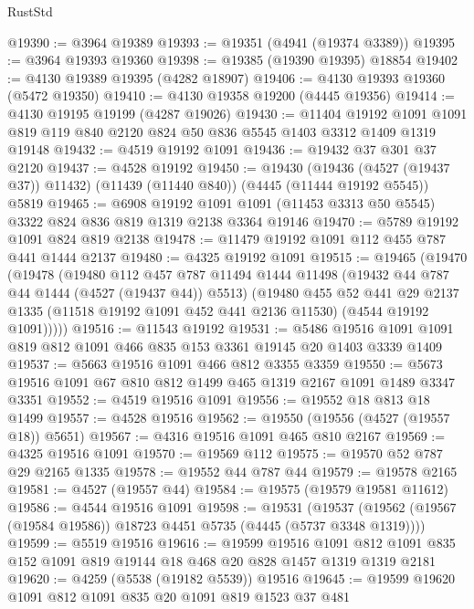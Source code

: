 \begin{lexlean}{RustStd}
\begin{coremodule}
@19390 := @3964 @19389
@19393 := @19351 (@4941 (@19374 @3389))
@19395 := @3964 @19393 @19360
@19398 := @19385 (@19390 @19395) @18854
@19402 := @4130 @19389 @19395 (@4282 @18907)
@19406 := @4130 @19393 @19360 (@5472 @19350)
@19410 := @4130 @19358 @19200 (@4445 @19356)
@19414 := @4130 @19195 @19199 (@4287 @19026)
@19430 := @11404
    @19192
    @1091
    @1091
    @819
    @119
    @840
    @2120
    @824
    @50
    @836
    @5545
    @1403
    @3312
    @1409
    @1319
    @19148
@19432 := @4519 @19192 @1091
@19436 := @19432 @37 @301 @37 @2120
@19437 := @4528 @19192
@19450 := @19430
    (@19436 (@4527 (@19437 @37)) @11432)
    (@11439 (@11440 @840))
    (@4445 (@11444 @19192 @5545))
    @5819
@19465 := @6908
    @19192
    @1091
    @1091
    (@11453 @3313 @50 @5545)
    @3322
    @824
    @836
    @819
    @1319
    @2138
    @3364
    @19146
@19470 := @5789 @19192 @1091 @824 @819 @2138
@19478 := @11479 @19192 @1091 @112 @455 @787 @441 @1444 @2137
@19480 := @4325 @19192 @1091
@19515 := @19465
    (@19470
      (@19478
        (@19480
          @112
          @457
          @787
          @11494
          @1444
          @11498
          (@19432 @44 @787 @44 @1444 (@4527 (@19437 @44)) @5513)
          (@19480
            @455
            @52
            @441
            @29
            @2137
            @1335
            (@11518 @19192 @1091 @452 @441 @2136 @11530)
            (@4544 @19192 @1091)))))
@19516 := @11543 @19192
@19531 := @5486 @19516 @1091 @1091 @819 @812 @1091 @466 @835 @153 @3361 @19145 @20 @1403 @3339 @1409
@19537 := @5663 @19516 @1091 @466 @812 @3355 @3359
@19550 := @5673 @19516 @1091 @67 @810 @812 @1499 @465 @1319 @2167 @1091 @1489 @3347 @3351
@19552 := @4519 @19516 @1091
@19556 := @19552 @18 @813 @18 @1499
@19557 := @4528 @19516
@19562 := @19550 (@19556 (@4527 (@19557 @18)) @5651)
@19567 := @4316 @19516 @1091 @465 @810 @2167
@19569 := @4325 @19516 @1091
@19570 := @19569 @112
@19575 := @19570 @52 @787 @29 @2165 @1335
@19578 := @19552 @44 @787 @44
@19579 := @19578 @2165
@19581 := @4527 (@19557 @44)
@19584 := @19575 (@19579 @19581 @11612)
@19586 := @4544 @19516 @1091
@19598 := @19531
    (@19537 (@19562 (@19567 (@19584 @19586)) @18723 @4451 @5735 (@4445 (@5737 @3348 @1319))))
@19599 := @5519 @19516
@19616 := @19599
    @19516
    @1091
    @812
    @1091
    @835
    @152
    @1091
    @819
    @19144
    @18
    @468
    @20
    @828
    @1457
    @1319
    @1319
    @2181
@19620 := @4259 (@5538 (@19182 @5539)) @19516
@19645 := @19599
    @19620
    @1091
    @812
    @1091
    @835
    @20
    @1091
    @819
    @1523
    @37
    @481

\end{coremodule}
\end{lexlean}
